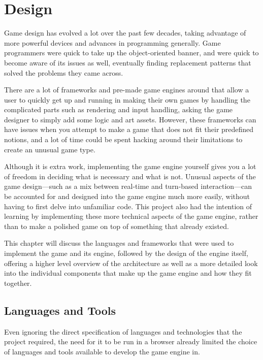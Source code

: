 \chapter{Design}\label{chap:design}

Game design has evolved a lot over the past few decades, taking advantage of more powerful devices and advances in programming generally. Game programmers were quick to take up the object-oriented banner, and were quick to become aware of its issues as well, eventually finding replacement patterns that solved the problems they came across.

There are a lot of frameworks and pre-made game engines around that allow a user to quickly get up and running in making their own games by handling the complicated parts such as rendering and input handling, asking the game designer to simply add some logic and art assets. However, these frameworks can have issues when you attempt to make a game that does not fit their predefined notions, and a lot of time could be spent hacking around their limitations to create an unusual game type.

Although it is extra work, implementing the game engine yourself gives you a lot of freedom in deciding what is necessary and what is not. Unusual aspects of the game design---such as a mix between real-time and turn-based interaction---can be accounted for and designed into the game engine much more easily, without having to first delve into unfamiliar code. This project also had the intention of learning by implementing these more technical aspects of the game engine, rather than to make a polished game on top of something that already existed.

This chapter will discuss the languages and frameworks that were used to implement the game and its engine, followed by the design of the engine itself, offering a higher level overview of the architecture as well as a more detailed look into the individual components that make up the game engine and how they fit together.

\section{Languages and Tools}
Even ignoring the direct specification of languages and technologies that the project required, the need for it to be run in a browser already limited the choice of languages and tools available to develop the game engine in.

